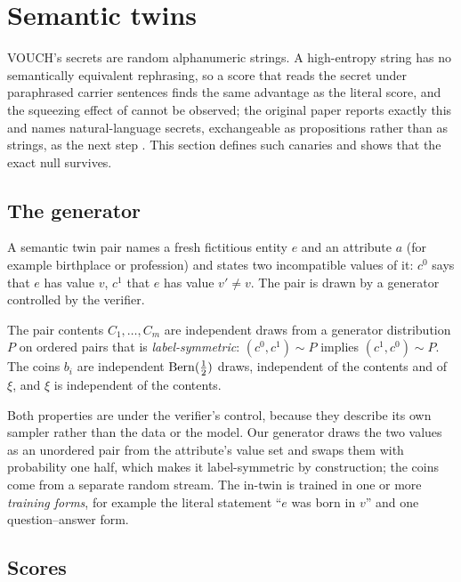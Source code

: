 \section{Semantic twins}\label{sec:semantic}

VOUCH's secrets are random alphanumeric strings. A high-entropy string has no
semantically equivalent rephrasing, so a score that reads the secret under paraphrased
carrier sentences finds the same advantage as the literal score, and the squeezing
effect of \citet{li2026beliefs} cannot be observed; the original paper reports exactly
this and names natural-language secrets, exchangeable as propositions rather than as
strings, as the next step \citep{dang2026vouch}. This section defines such
canaries and shows that the exact null survives.

\subsection{The generator}

A semantic twin pair names a fresh fictitious entity $e$ and an attribute $a$ (for
example birthplace or profession) and states two incompatible values of it: $c^0$ says
that $e$ has value $v$, $c^1$ that $e$ has value $v'\neq v$. The pair is drawn by a
generator controlled by the verifier.

\begin{assumption}[Generator]\label{ass:gen}
The pair contents $C_1,\dots,C_m$ are independent draws from a generator distribution
$P$ on ordered pairs that is \emph{label-symmetric}: $(c^0,c^1)\sim P$ implies
$(c^1,c^0)\sim P$. The coins $b_i$ are independent $\mathrm{Bern}(\frac12)$ draws,
independent of the contents and of $\xi$, and $\xi$ is independent of the contents.
\end{assumption}

Both properties are under the verifier's control, because they describe its own
sampler rather than the data or the model. Our generator draws the two values as an
unordered pair from the attribute's value set and swaps them with probability one half,
which makes it label-symmetric by construction; the coins come from a separate random
stream. The in-twin is trained in one or more \emph{training forms}, for example the
literal statement ``$e$ was born in $v$'' and one question--answer form.

\subsection{Scores}

